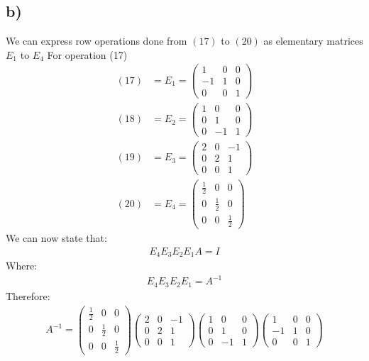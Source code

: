 \documentclass[11pt]{article}
\begin{document}
\subsection{b)}
We can express row operations done from $(17)$ to $(20)$ as elementary matrices $E_1$ to $E_4$
For operation (17)
\begin{align*}
(17)&=E_1=
\left(\begin{array}{ccc}
1 & 0 & 0 \\
-1 & 1 & 0 \\
0 & 0 & 1
\end{array}\right)
\\
(18)&=E_2=
\left(\begin{array}{ccc}
1 & 0 & 0 \\
0 & 1 & 0 \\
0 & -1 & 1
\end{array}\right)
\\
(19)&=E_3=
\left(\begin{array}{ccc}
2 & 0 & -1 \\
0 & 2 & 1 \\
0 & 0 & 1
\end{array}\right)
\\
(20)&=E_4=
\left(\begin{array}{ccc}
\frac{1}{2} & 0 & 0 \\
0 & \frac{1}{2} & 0 \\
0 & 0 & \frac{1}{2}
\end{array}\right)
\end{align*}
We can now state that:
\begin{align}
E_4E_3E_2E_1A=I
\end{align}
Where:
\begin{align}
E_4E_3E_2E_1=A^{-1}
\end{align}
Therefore:
\begin{align*}
A^{-1}=\left(\begin{array}{ccc}
\frac{1}{2} & 0 & 0 \\
0 & \frac{1}{2} & 0 \\
0 & 0 & \frac{1}{2}
\end{array}\right)
\left(\begin{array}{ccc}
2 & 0 & -1 \\
0 & 2 & 1 \\
0 & 0 & 1
\end{array}\right)
\left(\begin{array}{ccc}
1 & 0 & 0 \\
0 & 1 & 0 \\
0 & -1 & 1
\end{array}\right)
\left(\begin{array}{ccc}
1 & 0 & 0 \\
-1 & 1 & 0 \\
0 & 0 & 1
\end{array}\right)
\end{align*}
\end{document}
